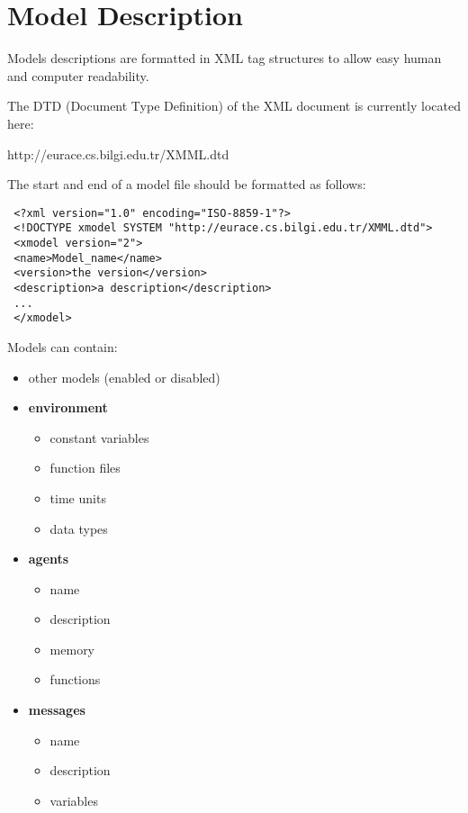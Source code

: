 \section{Model Description}\label{model_description}

Models descriptions are formatted in XML tag structures to allow
easy human and computer readability.

The DTD (Document Type Definition) of the XML document is currently located
here:

http://eurace.cs.bilgi.edu.tr/XMML.dtd

The start and end of a model file should be formatted as follows:

\begin{mylisting}
\begin{verbatim}
 <?xml version="1.0" encoding="ISO-8859-1"?>
 <!DOCTYPE xmodel SYSTEM "http://eurace.cs.bilgi.edu.tr/XMML.dtd">
 <xmodel version="2">
 <name>Model_name</name>
 <version>the version</version>
 <description>a description</description>
 ...
 </xmodel>
\end{verbatim}
\end{mylisting}

Models can contain:
\begin{itemize}
\item other models (enabled or disabled)
\item \textbf{environment}
\begin{itemize}
\item constant variables
\item function files
\item time units
\item data types
\end{itemize}
\item \textbf{agents}
\begin{itemize}
\item name
\item description
\item memory
\item functions
\end{itemize}
\item \textbf{messages}
\begin{itemize}
\item name
\item description
\item variables
\end{itemize}
\end{itemize}

